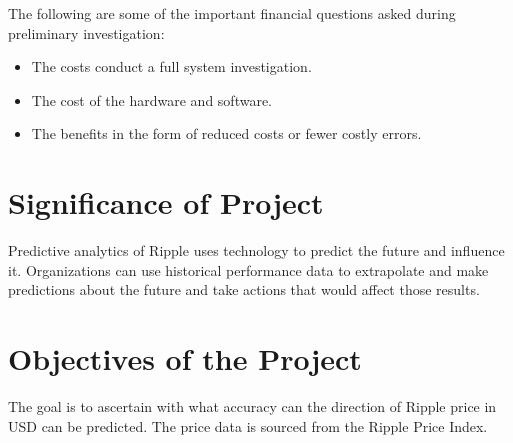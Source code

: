The following are some of the important financial questions asked during preliminary investigation:
\begin{itemize}
    \item The costs conduct a full system investigation.
    \item The cost of the hardware and software.
    \item The benefits in the form of reduced costs or fewer costly errors.
\end{itemize}


\section{Significance of Project}
Predictive analytics of Ripple uses technology to predict the future and influence it. Organizations can use historical performance data to extrapolate and make predictions about the future and take actions that would affect those results.

\section{Objectives of the Project}
The goal is to ascertain with what accuracy can the direction of Ripple price in USD can be predicted. The price data is sourced from the Ripple Price Index.
